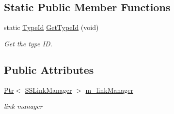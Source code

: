 \subsection*{Static Public Member Functions}
\begin{DoxyCompactItemize}
\item 
static \hyperlink{classns3_1_1TypeId}{Type\+Id} \hyperlink{classns3_1_1SubscriberStationNetDevice_abbce9c3781b59571a01f3c1adbc3f70d}{Get\+Type\+Id} (void)
\begin{DoxyCompactList}\small\item\em Get the type ID. \end{DoxyCompactList}\end{DoxyCompactItemize}
\subsection*{Public Attributes}
\begin{DoxyCompactItemize}
\item 
\hyperlink{classns3_1_1Ptr}{Ptr}$<$ \hyperlink{classns3_1_1SSLinkManager}{S\+S\+Link\+Manager} $>$ \hyperlink{classns3_1_1SubscriberStationNetDevice_a24e7df59fb312c196318f0366b63c6e6}{m\+\_\+link\+Manager}
\begin{DoxyCompactList}\small\item\em link manager \end{DoxyCompactList}\end{DoxyCompactItemize}
